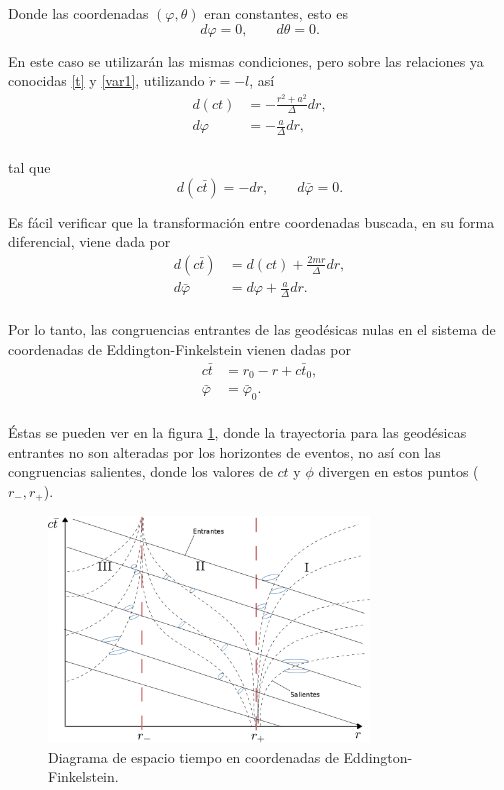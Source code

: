 Donde las coordenadas $(\varphi,\theta )$ eran constantes, esto es
\begin{equation}
d\varphi=0, \qquad d\theta=0 .
\end{equation}

En este caso se utilizar\'an las mismas condiciones, pero sobre las relaciones ya conocidas \eqref{t} y \eqref{var1}, utilizando $\dot{r}=-l$, as\'i
\begin{equation}
\begin{aligned}
d(ct)&=-\frac{r^2+a^2}{\Delta}dr,\\
d \varphi&=-\frac{a}{\Delta}dr,\\
\end{aligned}
\end{equation}

tal que
\begin{equation}
d\left(c\bar{t}\right)=-dr, \qquad d\bar{\varphi}=0 .
\end{equation}

Es f\'acil verificar que la transformaci\'on entre coordenadas buscada, en su forma diferencial, viene dada por
\begin{equation}
\begin{aligned}
d\left(c\bar{t}\right)&=d(ct)+\frac{2mr}{\Delta}dr,\\
d\bar{\varphi}&=d	\varphi+\frac{a}{\Delta}dr.\\
\end{aligned}
\end{equation}

Por lo tanto, las congruencias entrantes de las geod\'esicas nulas  en el sistema de coordenadas de Eddington-Finkelstein vienen dadas por
\begin{equation}
\begin{aligned}
c\bar{t}&=r_0-r+c\bar{t}_0,\\
\bar{\varphi}&=\bar{\varphi}_0.\\
\end{aligned}
\end{equation}

\'Estas se pueden ver en la figura \ref{fig:conos2}, donde la trayectoria para las geod\'esicas entrantes no son alteradas por los horizontes de eventos, no as\'i con las congruencias salientes, donde los valores de $ct$ y $\phi$ divergen en estos puntos ($r_-,r_+$).\\
\begin{figure}[H]
 \centering
\includegraphics[height=6cm,angle=0]{fig/fig-conos2.pdf}
\caption{Diagrama de espacio tiempo en coordenadas de Eddington-Finkelstein.}
\label{fig:conos2}
\end{figure}

